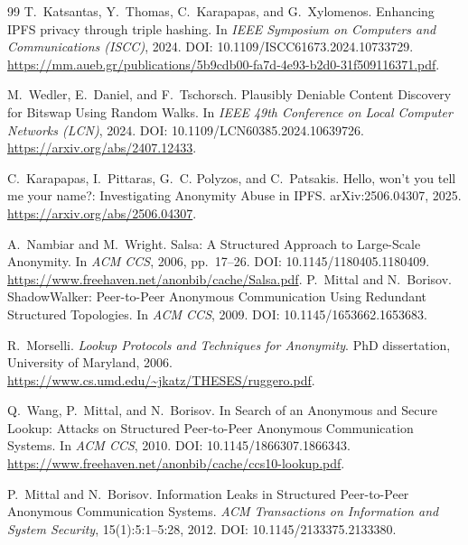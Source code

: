 \documentclass[11pt]{article}
\theoremstyle{definition}
\theoremstyle{remark}
\begin{document}
\begin{thebibliography}{99}
T.~Katsantas, Y.~Thomas, C.~Karapapas, and G.~Xylomenos.
\newblock Enhancing IPFS privacy through triple hashing.
\newblock In \emph{IEEE Symposium on Computers and Communications (ISCC)}, 2024.
\newblock DOI: 10.1109/ISCC61673.2024.10733729.
\newblock \url{https://mm.aueb.gr/publications/5b9cdb00-fa7d-4e93-b2d0-31f509116371.pdf}.

M.~Wedler, E.~Daniel, and F.~Tschorsch.
\newblock Plausibly Deniable Content Discovery for Bitswap Using Random Walks.
\newblock In \emph{IEEE 49th Conference on Local Computer Networks (LCN)}, 2024.
\newblock DOI: 10.1109/LCN60385.2024.10639726.
\newblock \url{https://arxiv.org/abs/2407.12433}.

C.~Karapapas, I.~Pittaras, G.~C. Polyzos, and C.~Patsakis.
\newblock Hello, won't you tell me your name?: Investigating Anonymity Abuse in IPFS.
\newblock arXiv:2506.04307, 2025.
\newblock \url{https://arxiv.org/abs/2506.04307}.



A.~Nambiar and M.~Wright.
\newblock Salsa: A Structured Approach to Large-Scale Anonymity.
\newblock In \emph{ACM CCS}, 2006, pp.~17--26.
\newblock DOI: 10.1145/1180405.1180409.
\newblock \url{https://www.freehaven.net/anonbib/cache/Salsa.pdf}.
P.~Mittal and N.~Borisov.
\newblock ShadowWalker: Peer-to-Peer Anonymous Communication Using Redundant Structured Topologies.
\newblock In \emph{ACM CCS}, 2009.
\newblock DOI: 10.1145/1653662.1653683.

R.~Morselli.
\newblock \emph{Lookup Protocols and Techniques for Anonymity}.
\newblock PhD dissertation, University of Maryland, 2006.
\newblock \url{https://www.cs.umd.edu/~jkatz/THESES/ruggero.pdf}.

Q.~Wang, P.~Mittal, and N.~Borisov.
\newblock In Search of an Anonymous and Secure Lookup: Attacks on Structured Peer-to-Peer Anonymous Communication Systems.
\newblock In \emph{ACM CCS}, 2010.
\newblock DOI: 10.1145/1866307.1866343.
\newblock \url{https://www.freehaven.net/anonbib/cache/ccs10-lookup.pdf}.

P.~Mittal and N.~Borisov.
\newblock Information Leaks in Structured Peer-to-Peer Anonymous Communication Systems.
\newblock \emph{ACM Transactions on Information and System Security}, 15(1):5:1--5:28, 2012.
\newblock DOI: 10.1145/2133375.2133380.


\end{thebibliography}
\end{document}
